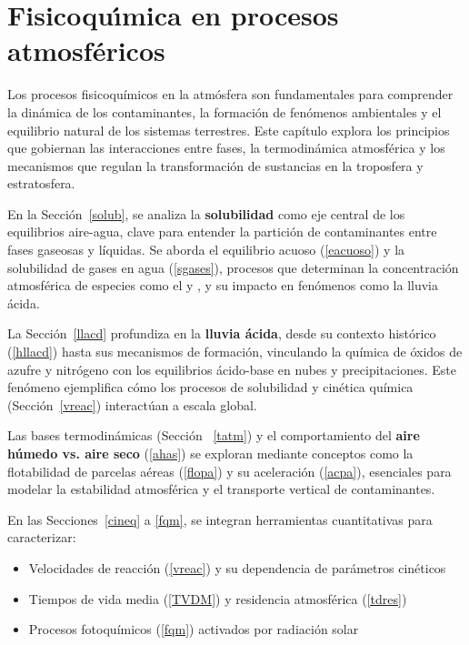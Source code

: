 \chapter[Procesos atmosf\'ericos]{Fisicoqu\'{\i}mica en procesos atmosf\'ericos}

Los procesos fisicoquímicos en la atmósfera son fundamentales para comprender la dinámica de los contaminantes, la formación de fenómenos ambientales y el equilibrio natural de los sistemas terrestres. Este capítulo explora los principios que gobiernan las interacciones entre fases, la termodinámica atmosférica y los mecanismos que regulan la transformación de sustancias en la troposfera y estratosfera.

En la Sección~\ref{solub}, se analiza la \textbf{solubilidad} como eje central de los equilibrios aire-agua, clave para entender la partición de contaminantes entre fases gaseosas y líquidas. Se aborda el equilibrio acuoso (\ref{eacuoso}) y la solubilidad de gases en agua (\ref{sgases}), procesos que determinan la concentración atmosférica de especies como el  y , y su impacto en fenómenos como la lluvia ácida.

La Sección~\ref{llacd} profundiza en la \textbf{lluvia ácida}, desde su contexto histórico (\ref{hllacd}) hasta sus mecanismos de formación, vinculando la química de óxidos de azufre y nitrógeno con los equilibrios ácido-base en nubes y precipitaciones. Este fenómeno ejemplifica cómo los procesos de solubilidad y cinética química (Sección~\ref{vreac}) interactúan a escala global.

Las bases termodinámicas (Sección ~\ref{tatm}) y el comportamiento del \textbf{aire húmedo vs. aire seco} (\ref{ahas}) se exploran mediante conceptos como la flotabilidad de parcelas aéreas (\ref{flopa}) y su aceleración (\ref{acpa}), esenciales para modelar la estabilidad atmosférica y el transporte vertical de contaminantes.

En las Secciones~\ref{cineq}  a \ref{fqm}, se integran herramientas cuantitativas para caracterizar:
\begin{itemize}
    \item Velocidades de reacción (\ref{vreac}) y su dependencia de parámetros cinéticos
    \item Tiempos de vida media (\ref{TVDM}) y residencia atmosférica (\ref{tdres})
    \item Procesos fotoquímicos (\ref{fqm}) activados por radiación solar
\end{itemize}

